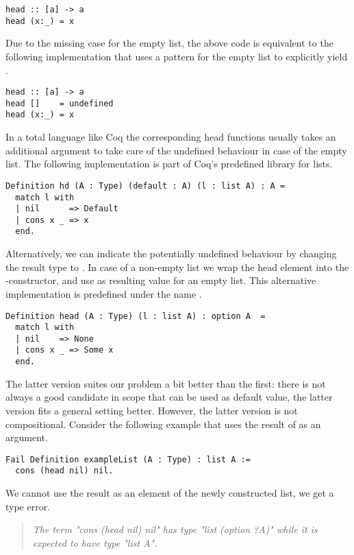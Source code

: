 \begin{verbatim}
head :: [a] -> a
head (x:_) = x
\end{verbatim}

\noindent 
Due to the missing case for the empty list, the above code is equivalent to the following implementation that uses a pattern for the empty list to explicitly yield .

\begin{verbatim}
head :: [a] -> a
head []    = undefined
head (x:_) = x
\end{verbatim}

In a total language like Coq the corresponding head functions usually takes an additional argument to take care of the undefined behaviour in case of the empty list.
The following implementation is part of Coq's predefined library for lists.

\begin{verbatim}
Definition hd (A : Type) (default : A) (l : list A) : A = 
  match l with
  | nil      => Default
  | cons x _ => x
  end.
\end{verbatim}

Alternatively, we can indicate the potentially undefined behaviour by changing the result type to .
In case of a non-empty list we wrap the head element into the -constructor, and use  as resulting value for an empty list.
This alternative implementation is predefined under the name .

\begin{verbatim}
Definition head (A : Type) (l : list A) : option A  = 
  match l with
  | nil    => None
  | cons x _ => Some x
  end.
\end{verbatim}

The latter version suites our problem a bit better than the first: there is not always a good candidate in scope that can be used as default value, the latter version fits a general setting better.
However, the latter version is not compositional.
Consider the following example that uses the result of  as an argument.

\begin{verbatim}
Fail Definition exampleList (A : Type) : list A :=
  cons (head nil) nil.
\end{verbatim}

We cannot use the result as an element of the newly constructed list, we get a type error.

\begin{quote}
\emph{The term "cons (head nil) nil" has type "list (option ?A)" while it is expected to have type "list A".}
\end{quote}

